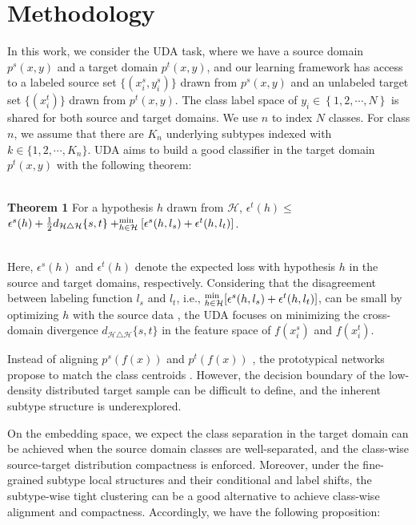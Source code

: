 \section{Methodology} 



In this work, we consider the UDA task, where we have a source domain $p^s(x,y)$ and a target domain $p^t(x,y)$, and our learning framework has access to a labeled source set $\{(x_i^s,y_i^s)\}$ drawn from $p^s(x,y)$ and an unlabeled target set $\{(x_i^t)\}$ drawn from $p^t(x,y)$. The class label space of $y_i\in\left\{1,2,\cdots,N\right\}$ is shared for both source and target domains. We use $n$ to index $N$ classes. For class $n$, we assume that there are $K_n$ underlying subtypes indexed with $k\in\{1,2,\cdots, K_n\}$. UDA aims to build a good classifier in the target domain $p^t(x,y)$ with the following theorem: \\~


\noindent\textbf{Theorem 1} For a hypothesis $h$ drawn from $\mathcal{H}$, $\epsilon^t(h)\leq$ $\epsilon^s(h)+\frac{1}{2}d_{\mathcal{H}\triangle\mathcal{H}}\{s,t\}+^{\rm{min}}_{h\in\mathcal{H}}[\epsilon^s({h},l_s)+\epsilon^t({h},l_t)]$. \\~

 
 
\noindent Here, $\epsilon^s(h)$ and $\epsilon^t(h)$ denote the expected loss with hypothesis $h$ in the source and target domains, respectively. Considering that the disagreement between labeling function $l_s$ and $l_t$, i.e., $^{\rm{min}}_{h\in\mathcal{H}}[\epsilon^s({h},l_s)+\epsilon^t({h},l_t)]$, can be small by optimizing $h$ with the source data \cite{ben2007analysis}, the UDA focuses on minimizing the cross-domain divergence $d_{\mathcal{H}\triangle\mathcal{H}}\{s,t\}$ in the feature space of $f(x_i^s)$ and $f(x_i^t)$.


Instead of aligning $p^s(f(x))$ and $p^t(f(x))$ \cite{kouw2018introduction}, the prototypical networks propose to match the class centroids \cite{pan2019transferrable}. However, the decision boundary of the low-density distributed target sample can be difficult to define, and the inherent subtype structure is underexplored.  
 
On the embedding space, we expect the class separation in the target domain can be achieved when the source domain classes are well-separated, and the class-wise source-target distribution compactness is enforced. Moreover, under the fine-grained subtype local structures and their conditional and label shifts, the subtype-wise tight clustering can be a good alternative to achieve class-wise alignment and compactness. Accordingly, we have the following proposition:\\~

